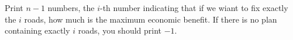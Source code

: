 Print $n-1$ numbers, the $i$-th number indicating that if we wiant 
to fix exactly the $i$ roads, how much is the maximum economic benefit.
If there is no plan containing exactly $i$ roads, you should print $-1$.
